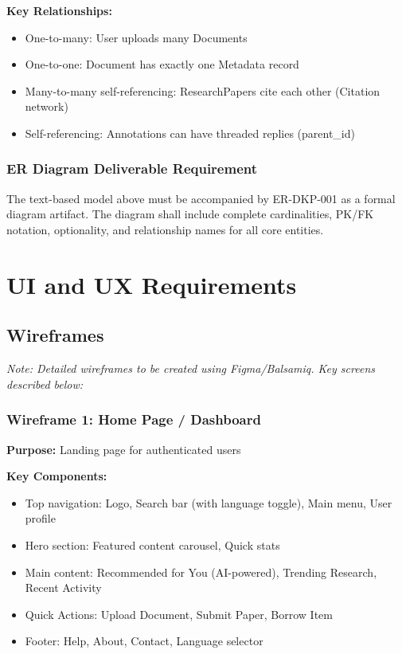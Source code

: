 \documentclass[12pt,a4paper]{report}
\begin{document}
\textbf{Key Relationships:}
\begin{itemize}
    \item One-to-many: User uploads many Documents
    \item One-to-one: Document has exactly one Metadata record
    \item Many-to-many self-referencing: ResearchPapers cite each other (Citation network)
    \item Self-referencing: Annotations can have threaded replies (parent\_id)
\end{itemize}

\subsection{ER Diagram Deliverable Requirement}
The text-based model above must be accompanied by ER-DKP-001 as a formal diagram artifact. The diagram shall include complete cardinalities, PK/FK notation, optionality, and relationship names for all core entities.

\chapter{UI and UX Requirements}

\section{Wireframes}

\textit{Note: Detailed wireframes to be created using Figma/Balsamiq. Key screens described below:}

\subsection{Wireframe 1: Home Page / Dashboard}
\textbf{Purpose:} Landing page for authenticated users

\textbf{Key Components:}
\begin{itemize}
    \item Top navigation: Logo, Search bar (with language toggle), Main menu, User profile
    \item Hero section: Featured content carousel, Quick stats
    \item Main content: Recommended for You (AI-powered), Trending Research, Recent Activity
    \item Quick Actions: Upload Document, Submit Paper, Borrow Item
    \item Footer: Help, About, Contact, Language selector
\end{itemize}
\end{document}
